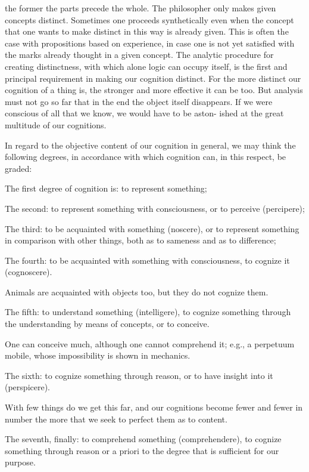     the former the parts precede the whole. The philosopher only makes given
    concepts distinct.
    Sometimes one proceeds synthetically even when the
    concept that one wants to make distinct in this way is already given.
    This is often the case with propositions based on experience, in case one is not
    yet satisfied with the marks already thought in a given concept.
    The analytic procedure for creating distinctness, with which alone logic
    can occupy itself, is the first and principal requirement in making our
    cognition distinct.
    For the more distinct our cognition of a thing is, the
    stronger and more effective it can be too.
    But analysis must not go so far
    that in the end the object itself disappears.
    If we were conscious of all that we know, we would have to be aston-
    ished at the great multitude of our cognitions.

    In regard to the objective content of our cognition in general,
    we may think the following degrees, in accordance with which
    cognition can, in this respect, be graded:

    The first degree of cognition is: to represent something;

    The second: to represent something with consciousness,
    or to perceive (percipere);

    The third: to be acquainted with something (noscere), or
    to represent something in comparison with other things,
    both as to sameness and as to difference;

    The fourth: to be acquainted with something with consciousness,
    to cognize it (cognoscere).

    Animals are acquainted with objects too, but they do not cognize them.

    The fifth: to understand something (intelligere),
    to cognize something through the understanding by means of concepts,
    or to conceive.

    One can conceive much, although one cannot comprehend it;
    e.g., a perpetuum mobile, whose impossibility is shown in mechanics.

    The sixth: to cognize something through reason, or
    to have insight into it (perspicere).

    With few things do we get this far,
    and our cognitions become fewer and fewer in number
    the more that we seek to perfect them as to content.

    The seventh, finally: to comprehend something (comprehendere),
    to cognize something through reason or a priori
    to the degree that is sufficient for our purpose.

